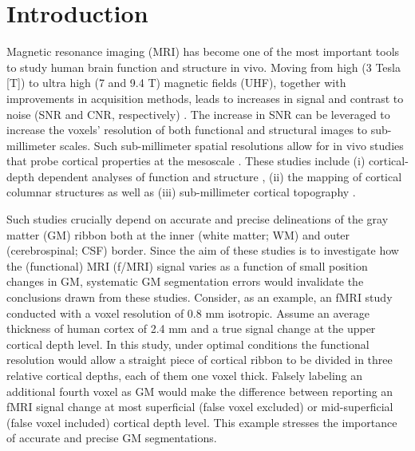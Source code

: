 \section{Introduction}
Magnetic resonance imaging (MRI) has become one of the most important tools to study human brain function and structure in vivo. Moving from high (3 Tesla [T]) to ultra high (7 and 9.4 T) magnetic fields (UHF), together with improvements in acquisition methods, leads to increases in signal and contrast to noise (SNR and CNR, respectively) \cite{Vaughan2001, Duyn2011, Ugurbil2014}. The increase in SNR can be leveraged to increase the voxels' resolution of both functional and structural images to sub-millimeter scales. Such sub-millimeter spatial resolutions allow for in vivo studies that probe cortical properties at the mesoscale \cite{DeMartino2017, Kemper2017, Dumoulin2017, Polimeni2017, Trampel2017}. These studies include (i) cortical-depth dependent analyses of function \cite{Polimeni2010, Koopmans2011, DeMartino2013, Huber2015, Muckli2015, Kok2016} and structure \cite{Kemper2017,Waehnert2014,Trampel2017}, (ii) the mapping of cortical columnar structures \cite{Yacoub2008, Zimmermann2011, DeMartino2015, Goncalves2015, Nasr2016, Tootell2017} as well as (iii) sub-millimeter cortical topography \cite{Harvey2013, Harvey2015, DeMartino2015, Fracasso2016}.

Such studies crucially depend on accurate and precise delineations of the gray matter (GM) ribbon both at the inner (white matter; WM) and outer (cerebrospinal; CSF) border. Since the aim of these studies is to investigate how the (functional) MRI (f/MRI) signal varies as a function of small position changes in GM, systematic GM segmentation errors would invalidate the conclusions drawn from these studies. Consider, as an example, an fMRI study conducted with a voxel resolution of 0.8 mm isotropic. Assume an average thickness of human cortex of 2.4 mm and a true signal change at the upper cortical depth level. In this study, under optimal conditions the functional resolution would allow a straight piece of cortical ribbon to be divided in three relative cortical depths, each of them one voxel thick. Falsely labeling an additional fourth voxel as GM would make the difference between reporting an fMRI signal change at most superficial (false voxel excluded) or mid-superficial (false voxel included) cortical depth level. This example stresses the importance of accurate and precise GM segmentations. 


